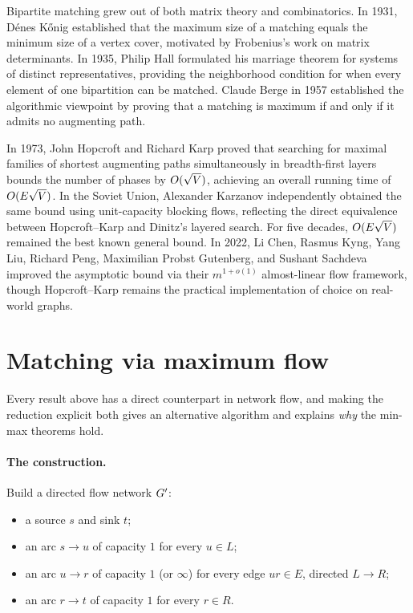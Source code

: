 \begin{historybox}
Bipartite matching grew out of both matrix theory and combinatorics.
In 1931, D{\'e}nes K{\H{o}}nig established that the maximum size of a matching equals the minimum size
of a vertex cover, motivated by Frobenius's work on matrix determinants. In 1935, Philip Hall
formulated his marriage theorem for systems of distinct representatives, providing the
neighborhood condition for when every element of one bipartition can be matched. Claude Berge in 1957
established the algorithmic viewpoint by proving that a matching is maximum if and only if
it admits no augmenting path.

In 1973, John Hopcroft and Richard Karp proved that searching for maximal families of shortest
augmenting paths simultaneously in breadth-first layers bounds the number of phases by $O(\sqrt{V})$,
achieving an overall running time of $O(E\sqrt{V})$. In the Soviet Union, Alexander Karzanov
independently obtained the same bound using unit-capacity blocking flows, reflecting the direct
equivalence between Hopcroft--Karp and Dinitz's layered search. For five decades, $O(E\sqrt{V})$
remained the best known general bound. In 2022, Li Chen, Rasmus Kyng, Yang Liu, Richard Peng,
Maximilian Probst Gutenberg, and Sushant Sachdeva improved the asymptotic bound via their
$m^{1+o(1)}$ almost-linear flow framework, though Hopcroft--Karp remains the practical implementation
of choice on real-world graphs.
\end{historybox}

\section{Matching via maximum flow}
\label{ch15:flow}

Every result above has a direct counterpart in network flow, and making the reduction explicit both
gives an alternative algorithm and explains \emph{why} the min-max theorems hold.

\paragraph{The construction.}
Build a directed flow network $G'$:
\begin{itemize}
\item a source $s$ and sink $t$;
\item an arc $s\to u$ of capacity $1$ for every $u\in L$;
\item an arc $u\to r$ of capacity $1$ (or $\infty$) for every edge $ur\in E$,
directed $L\to R$;
\item an arc $r\to t$ of capacity $1$ for every $r\in R$.
\end{itemize}

